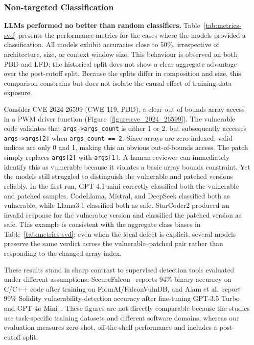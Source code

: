 \documentclass[lettersize,journal]{IEEEtran}
\begin{document}
\subsubsection{Non-targeted Classification}
\label{section:rq1-nontargeted}

\textbf{\glspl{LLM} performed no better than random classifiers.} Table~\ref{tab:metrics-svd} presents the performance metrics for the cases where the models provided a classification. All models exhibit accuracies close to 50\%, irrespective of architecture, size, or context window size. This behaviour is observed on both \gls{PBD} and \gls{LFD}; the historical split does not show a clear aggregate advantage over the post-cutoff split. Because the splits differ in composition and size, this comparison constrains but does not isolate the causal effect of training-data exposure.

Consider CVE-2024-26599 (CWE-119, PBD), a clear out-of-bounds array access in a PWM driver function (Figure~\ref{figure:cve_2024_26599}). The vulnerable code validates that \texttt{args->args\_count} is either 1 or 2, but subsequently accesses \texttt{args->args[2]} when \texttt{args\_count == 2}. Since arrays are zero-indexed, valid indices are only 0 and 1, making this an obvious out-of-bounds access. The patch simply replaces \texttt{args[2]} with \texttt{args[1]}. A human reviewer can immediately identify this as vulnerable because it violates a basic array bounds constraint. Yet the models still struggled to distinguish the vulnerable and patched versions reliably. In the first run, GPT-4.1-mini correctly classified both the vulnerable and patched samples. CodeLlama, Mistral, and DeepSeek classified both as vulnerable, while Llama3.1 classified both as safe. StarCoder2 produced an invalid response for the vulnerable version and classified the patched version as safe. This example is consistent with the aggregate class biases in Table~\ref{tab:metrics-svd}: even when the local defect is explicit, several models preserve the same verdict across the vulnerable--patched pair rather than responding to the changed array index.

These results stand in sharp contrast to supervised detection tools evaluated under different assumptions: SecureFalcon~\cite{ferrag2025securefalcon} reports 94\% binary accuracy on C/C++ code after training on FormAI/FalconVulnDB, and Alam et al.\ report 99\% Solidity vulnerability-detection accuracy after fine-tuning GPT-3.5 Turbo and GPT-4o Mini~\cite{alam2024detection}. These figures are not directly comparable because the studies use task-specific training datasets and different software domains, whereas our evaluation measures zero-shot, off-the-shelf performance and includes a post-cutoff split.
\end{document}
